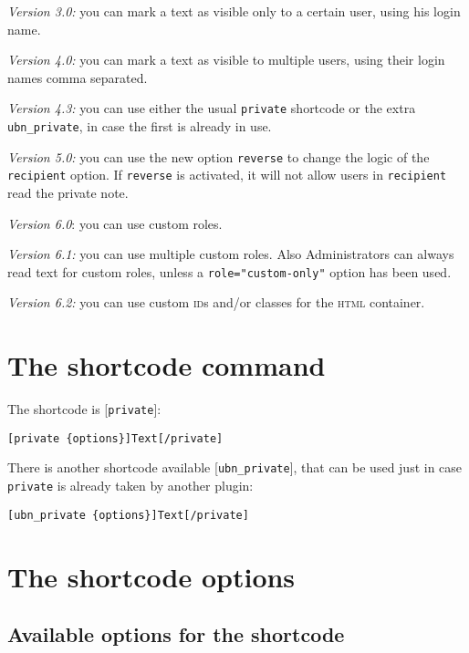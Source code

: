 \documentclass[a4paper,11pt]{article}
\begin{document}
\begin{description}
 \item \textit{Version 3.0:} you can mark a text as visible only to a certain user, using his login name.
 \item \textit{Version 4.0:} you can mark a text as visible to multiple users, using their login names comma separated.
 \item \textit{Version 4.3:} you can use either the usual \verb+private+ shortcode or the extra \verb+ubn_private+, in case the first is already in use.
 \item \textit{Version 5.0:} you can use the new option \verb+reverse+ to change the logic of the \verb+recipient+ option. If \verb+reverse+ is activated, it will not allow users in \verb+recipient+ read the private note.
 \item \textit{Version 6.0}: you can use custom roles.
 \item \textit{Version 6.1:} you can use multiple custom roles. Also Administrators can always read text for custom roles, unless a \verb+role="custom-only"+ option has been used.
 \item \textit{Version 6.2:} you can use custom \textsc{id}s and/or classes for the \textsc{html} container.
\end{description}

\section{The shortcode command}

The shortcode is [\verb+private+]:

\begin{lstlisting}
[private {options}]Text[/private]
\end{lstlisting}

There is another shortcode available [\verb+ubn_private+], that can be used just in case \verb+private+ is already taken by another plugin:

\begin{lstlisting}
[ubn_private {options}]Text[/private]
\end{lstlisting}

\section{The shortcode options}

\subsection{Available options for the shortcode}
\end{document}
